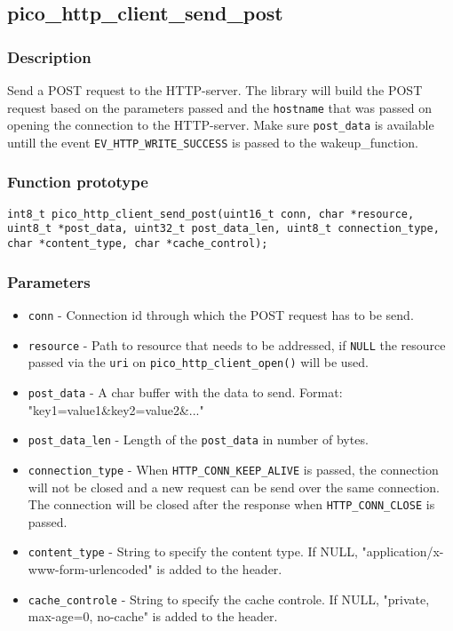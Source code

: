 
\subsection{pico\_http\_client\_send\_post}

\subsubsection*{Description}
Send a POST request to the HTTP-server. The library will build the POST request based on the parameters passed and the \texttt{hostname} that was passed on opening the connection to the HTTP-server. Make sure \texttt{post\_data} is available untill the event \texttt{EV\_HTTP\_WRITE\_SUCCESS} is passed to the wakeup\_function.

\subsubsection*{Function prototype}
\texttt{int8\_t pico\_http\_client\_send\_post(uint16\_t conn, char *resource, uint8\_t *post\_data, uint32\_t post\_data\_len, uint8\_t connection\_type, char *content\_type, char *cache\_control);}

\subsubsection*{Parameters}
\begin{itemize}[noitemsep]
\item \texttt{conn} - Connection id through which the POST request has to be send.
\item \texttt{resource} - Path to resource that needs to be addressed, if \texttt{NULL} the resource passed via the \texttt{uri} on \texttt{pico\_http\_client\_open()} will be used.
\item \texttt{post\_data} - A char buffer with the data to send. Format: "key1=value1\&key2=value2\&..."
\item \texttt{post\_data\_len} - Length of the \texttt{post\_data} in number of bytes.
\item \texttt{connection\_type} - When \texttt{HTTP\_CONN\_KEEP\_ALIVE} is passed, the connection will not be closed and a new request can be send over the same connection. The connection will be closed after the response when \texttt{HTTP\_CONN\_CLOSE} is passed.
\item \texttt{content\_type} - String to specify the content type. If NULL, "application/x-www-form-urlencoded" is added to the header.
\item \texttt{cache\_controle} - String to specify the cache controle. If NULL, "private, max-age=0, no-cache" is added to the header.
\end{itemize}
